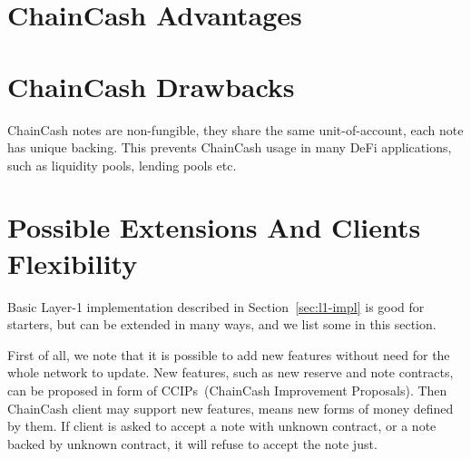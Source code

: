 \documentclass{article}   %
\newcommand{\cc}{ChainCash}
\begin{document}
\section{\cc{} Advantages}

\section{\cc{} Drawbacks}

ChainCash notes are non-fungible, they share the same unit-of-account, each note has unique backing. This prevents ChainCash usage
in many DeFi applications, such as liquidity pools, lending pools etc.


\section{Possible Extensions And Clients Flexibility}

Basic Layer-1 implementation described in Section~\ref{sec:l1-impl} is good for starters, but can be extended in many ways,
and we list some in this section.

First of all, we note that it is possible to add new features without need for the whole network to update. New features,
such as new reserve and note contracts, can be proposed in form of CCIPs~(ChainCash Improvement Proposals). Then ChainCash
client may support new features, means new forms of money defined by them. If client is asked to accept a note with unknown
contract, or a note backed by unknown contract, it will refuse to accept the note just.


\newpage

 
\end{document}
